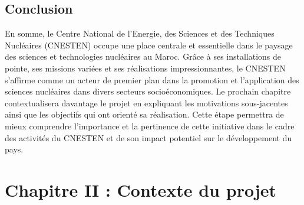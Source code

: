 \documentclass{report}
\newenvironment{mystyle}{
	\setlength{\parindent}{0pt} %
	\setlength{\parskip}{10pt} %
	\fontsize{12pt}{14pt}\selectfont %
}{
}
\let\oldchapter\chapter
\renewcommand{\chapter}[1]{\oldchapter{#1}}
\begin{document}
		\section{Conclusion}
				\begin{mystyle}
					En somme, le Centre National de l'Energie, des Sciences et des Techniques Nucléaires (CNESTEN) occupe une place centrale et essentielle dans le paysage des sciences et technologies nucléaires au Maroc. Grâce à ses installations de pointe, ses missions variées et ses réalisations impressionnantes, le CNESTEN s'affirme comme un acteur de premier plan dans la promotion et l'application des sciences nucléaires dans divers secteurs socioéconomiques. Le prochain chapitre contextualisera davantage le projet en expliquant les motivations sous-jacentes ainsi que les objectifs qui ont orienté sa réalisation. Cette étape permettra de mieux comprendre l'importance et la pertinence de cette initiative dans le cadre des activités du CNESTEN et de son impact potentiel sur le développement du pays.
		\end{mystyle}
		\chapter{Chapitre II : Contexte du projet}
		
\end{document}
